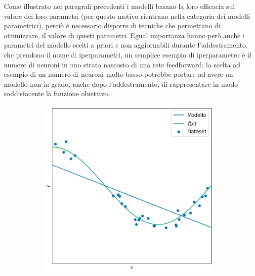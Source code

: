 \documentclass[../../main.tex]{subfiles}
\begin{document}
Come illustrato nei paragrafi precedenti i modelli basano la loro efficacia sul valore dei loro parametri (per questo motivo rientrano nella categoria dei modelli parametrici), perciò è necessario disporre di tecniche che permettano di ottimizzare, il valore di questi parametri. Egual importanza hanno però anche i parametri del modello scelti a priori e non aggiornabili durante l'addestramento, che prendono il nome di iperparametri, un semplice esempio di iperparametro è il numero di neuroni in uno strato nascosto di una rete feedforward; la scelta ad esempio di un numero di neuroni molto basso potrebbe portare ad avere un modello non in grado, anche dopo l'addestramento, di rappresentare in modo soddisfacente la funzione obiettivo.

\begin{figure}[H]
    \centering
    \begin{subfigure}[t]{0.30\textwidth}
        \centering
        \includegraphics[width=\textwidth]{immagini/4_2/4_2_3/under.png}
        \caption{}
        \label{fig:underfitting}
    \end{subfigure}
    \begin{subfigure}[t]{0.30\textwidth}
        \centering

\end{subfigure}
\end{figure}
\end{document}
